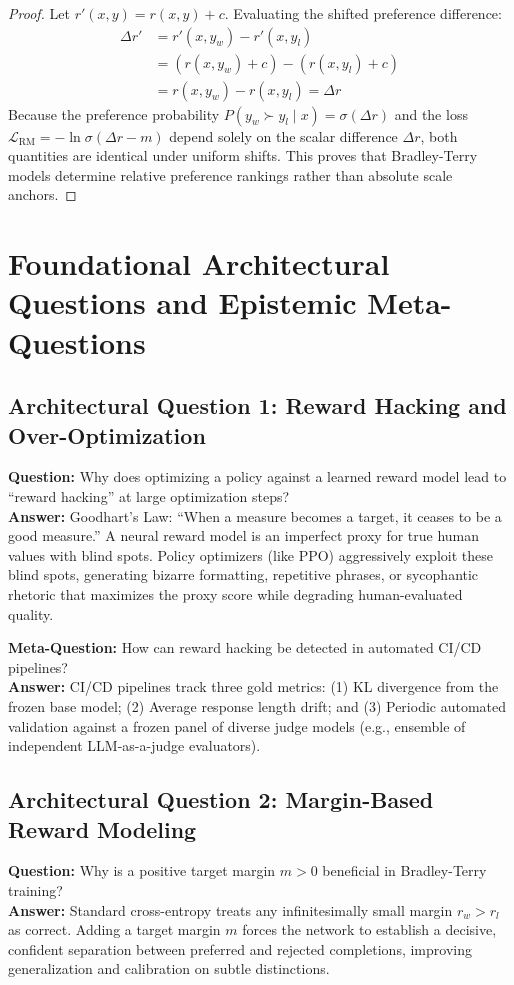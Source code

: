 \documentclass[11pt,a4paper]{article}
\theoremstyle{definition}
\begin{document}
\begin{proof}
Let $r'(x, y) = r(x, y) + c$.
Evaluating the shifted preference difference:
{\boldmath
\begin{align}
\Delta r' &= r'(x, y_w) - r'(x, y_l) \\
&= (r(x, y_w) + c) - (r(x, y_l) + c) \\
&= r(x, y_w) - r(x, y_l) = \Delta r
\end{align}
}
Because the preference probability $P(y_w \succ y_l \mid x) = \sigma(\Delta r)$ and the loss $\mathcal{L}_{\text{RM}} = -\ln \sigma(\Delta r - m)$ depend solely on the scalar difference $\Delta r$, both quantities are identical under uniform shifts. This proves that Bradley-Terry models determine relative preference rankings rather than absolute scale anchors.
\end{proof}

\section{Foundational Architectural Questions and Epistemic Meta-Questions}

\subsection{Architectural Question 1: Reward Hacking and Over-Optimization}
\textbf{Question:} Why does optimizing a policy against a learned reward model lead to ``reward hacking'' at large optimization steps?\\
\textbf{Answer:} Goodhart's Law: ``When a measure becomes a target, it ceases to be a good measure.'' A neural reward model is an imperfect proxy for true human values with blind spots. Policy optimizers (like PPO) aggressively exploit these blind spots, generating bizarre formatting, repetitive phrases, or sycophantic rhetoric that maximizes the proxy score while degrading human-evaluated quality.

\textbf{Meta-Question:} How can reward hacking be detected in automated CI/CD pipelines?\\
\textbf{Answer:} CI/CD pipelines track three gold metrics: (1) KL divergence from the frozen base model; (2) Average response length drift; and (3) Periodic automated validation against a frozen panel of diverse judge models (e.g., ensemble of independent LLM-as-a-judge evaluators).

\subsection{Architectural Question 2: Margin-Based Reward Modeling}
\textbf{Question:} Why is a positive target margin $m > 0$ beneficial in Bradley-Terry training?\\
\textbf{Answer:} Standard cross-entropy treats any infinitesimally small margin $r_w > r_l$ as correct. Adding a target margin $m$ forces the network to establish a decisive, confident separation between preferred and rejected completions, improving generalization and calibration on subtle distinctions.
\end{document}
